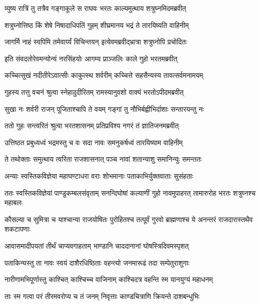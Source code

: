 
\twolineshloka
{व्युष्य रात्रिं तु तत्रैव गङ्गाकूले स राघवः}
{भरतः काल्यमुत्थाय शत्रुघ्नमिदमब्रवीत्} %

\twolineshloka
{शत्रुघ्नोत्तिष्ठ किं शेषे निषादाधिपतिं गुहम्}
{शीघ्रमानय भद्रं ते तारयिष्यति वाहिनीम्} %

\twolineshloka
{जागर्मि नाहं स्वपिमि तमेवार्य्यं विचिन्तयन्}
{इत्येवमब्रवीद्भ्रात्रा शत्रुघ्नोपि प्रचोदितः} %

\twolineshloka
{इति संवदतोरेवमन्योन्यं नरसिंहयोः}
{आगम्य प्राञ्जलिः काले गुहो भरतमब्रवीत्} %

\twolineshloka
{कच्चित्सुखं नदीतीरेऽवात्सीः काकुत्स्थ शर्वरीम्}
{कच्चित्ते सहसैन्यस्य तावत्सर्वमनामयम्} %

\twolineshloka
{गुहस्य तत्तु वचनं श्रुत्वा स्नेहादुदीरितम्}
{रामस्यानुवशो वाक्यं भरतोऽपीदमब्रवीत्} %

\twolineshloka
{सुखा नः शर्वरी राजन् पूजिताश्चापि ते वयम्}
{गङ्गां तु नौभिर्बह्वीभिर्दाशाः सन्तारयन्तु नः} %

\twolineshloka
{ततो गुहः सन्त्वरितं श्रुत्वा भरतशासनम्}
{प्रतिप्रविश्य नगरं तं ज्ञातिजनमब्रवीत्} %

\twolineshloka
{उत्तिष्ठत प्रबुध्यध्वं भद्रमस्तु च वः सदा}
{नावः समनुकर्षध्वं तारयिष्याम वाहिनीम्} %

\twolineshloka
{ते तथोक्ताः समुत्थाय त्वरिता राजशासनात्}
{पञ्च नावां शतान्याशु समानिन्युः समन्ततः} %

\twolineshloka
{अन्याः स्वस्तिकविज्ञेया महाघण्टाधरा वराः}
{शोभमानाः पताकाभिर्युक्तवाताः सुसंहताः} %

\threelineshloka
{ततः स्वस्तिकविज्ञेयां पाण्डुकम्बलसंवृताम्}
{सनन्दिघोषां कल्याणीं गुहो नावमुपाहरत्}
{तामारुरोह भरतः शत्रुघ्नश्च महाबलः} %

\threelineshloka
{कौसल्या च सुमित्रा च याश्चान्या राजयोषितः}
{पुरोहितश्च तत्पूर्वं गुरवो ब्राह्मणाश्च ये}
{अनन्तरं राजदारास्तथैव शकटापणाः} %

\twolineshloka
{आवासमादीपयतां तीर्थं चाप्यवगाहताम्}
{भाण्डानि चाददानानां घोषस्त्रिदिवमस्पृशत्} %

\twolineshloka
{पताकिन्यस्तु ता नावः स्वयं दाशैरधिष्ठिताः}
{वहन्त्यो जनमारूढं तदा सम्पेतुराशुगाः} %

\twolineshloka
{नारीणामभिपूर्णास्तु काश्चित् काश्चिच्च वाजिनाम्}
{काश्चिदत्र वहन्ति स्म यानयुग्यं महाधनम्} %

\twolineshloka
{ताः स्म गत्वा परं तीरमवरोप्य च तं जनम्}
{निवृत्ताः काण्डचित्राणि क्रियन्ते दाशबन्धुभिः} %

